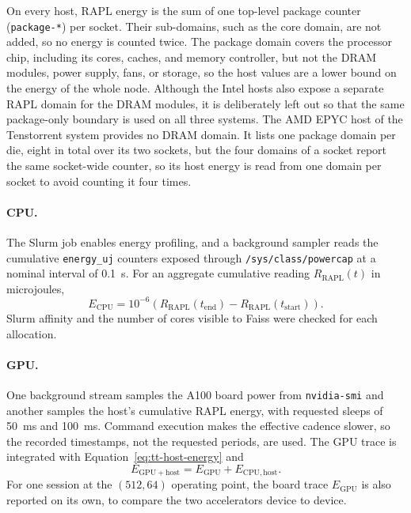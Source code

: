 On every host, RAPL energy is the sum of one top-level package counter
(\texttt{package-*}) per socket. Their sub-domains, such as the core
domain, are not added, so no energy is counted twice. The package domain
covers the processor chip, including its cores, caches, and memory controller,
but not the DRAM modules, power supply, fans, or storage, so the host values
are a lower bound on the energy of the whole node. Although the Intel hosts
also expose a separate RAPL domain for the DRAM modules, it is deliberately
left out so that the same package-only boundary is used on all three
systems. The AMD EPYC host of the Tenstorrent system provides no DRAM domain.
It lists one package domain per die, eight in total over its two sockets, but
the four domains of a socket report the same socket-wide counter, so its host
energy is read from one domain per socket to avoid counting it four times.

\paragraph{CPU.}
The Slurm job enables energy profiling, and a background sampler reads the
cumulative \texttt{energy\_uj} counters exposed through
\texttt{/sys/class/powercap} at a nominal interval of 0.1~s. For an aggregate
cumulative reading \(R_{\mathrm{RAPL}}(t)\) in microjoules,
\begin{equation}
E_{\mathrm{CPU}}
=10^{-6}\left(R_{\mathrm{RAPL}}(t_{\mathrm{end}})
-R_{\mathrm{RAPL}}(t_{\mathrm{start}})\right).
\label{eq:workload-energy}
\end{equation}
Slurm affinity and the number of cores visible to Faiss were checked for each
allocation.

\paragraph{GPU.}
One background stream samples the A100 board power from \texttt{nvidia-smi}
and another samples the host's cumulative RAPL energy, with requested sleeps of
50~ms and 100~ms. Command execution makes the effective cadence slower, so the
recorded timestamps, not the requested periods, are used. The GPU trace is
integrated with Equation~\ref{eq:tt-host-energy} and
\begin{equation}
E_{\mathrm{GPU+host}}=E_{\mathrm{GPU}}+E_{\mathrm{CPU,host}}.
\label{eq:gpu-host-energy}
\end{equation}
For one session at the \((512,64)\) operating point, the board trace
\(E_{\mathrm{GPU}}\) is also reported on its own, to compare the two
accelerators device to device.

